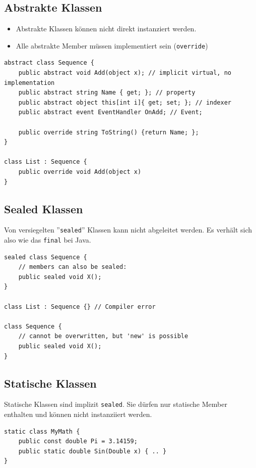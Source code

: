 \subsection{Abstrakte Klassen}
\begin{itemize}
	\item Abstrakte Klassen können nicht direkt instanziert werden. 
	\item Alle abstrakte Member müssen implementiert sein (\lstinline|override|)
\end{itemize}
\begin{lstlisting}
abstract class Sequence {
	public abstract void Add(object x); // implicit virtual, no implementation
	public abstract string Name { get; }; // property
	public abstract object this[int i]{ get; set; }; // indexer
	public abstract event EventHandler OnAdd; // Event;
	
	public override string ToString() {return Name; }; 
}

class List : Sequence {
	public override void Add(object x)
}
\end{lstlisting}

\subsection{Sealed Klassen}
Von versiegelten ''\lstinline|sealed|'' Klassen kann nicht abgeleitet werden. Es verhält sich also wie das \lstinline|final| bei Java.
\begin{lstlisting}
sealed class Sequence {
	// members can also be sealed:
	public sealed void X();
}

class List : Sequence {} // Compiler error

class Sequence {
	// cannot be overwritten, but 'new' is possible
	public sealed void X();
}

\end{lstlisting}

\subsection{Statische Klassen}
Statische Klassen sind implizit \lstinline|sealed|. Sie dürfen nur statische Member enthalten und können nicht instanziiert werden.
\begin{lstlisting}
static class MyMath {
	public const double Pi = 3.14159;
	public static double Sin(Double x) { .. }
}
\end{lstlisting}
\clearpage

